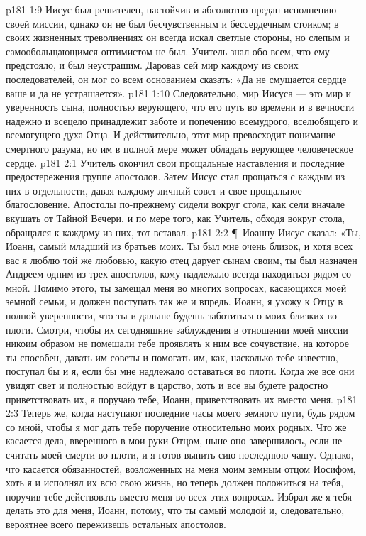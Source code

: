 \vs p181 1:9 Иисус был решителен, настойчив и абсолютно предан исполнению своей миссии, однако он не был бесчувственным и бессердечным стоиком; в своих жизненных треволнениях он всегда искал светлые стороны, но слепым и самообольщающимся оптимистом не был. Учитель знал обо всем, что ему предстояло, и был неустрашим. Даровав сей мир каждому из своих последователей, он мог со всем основанием сказать: «Да не смущается сердце ваше и да не устрашается».
\vs p181 1:10 Следовательно, мир Иисуса --- это мир и уверенность сына, полностью верующего, что его путь во времени и в вечности надежно и всецело принадлежит заботе и попечению всемудрого, вселюбящего и всемогущего духа Отца. И действительно, этот мир превосходит понимание смертного разума, но им в полной мере может обладать верующее человеческое сердце.
\vs p181 2:1 Учитель окончил свои прощальные наставления и последние предостережения группе апостолов. Затем Иисус стал прощаться с каждым из них в отдельности, давая каждому личный совет и свое прощальное благословение. Апостолы по\hyp{}прежнему сидели вокруг стола, как сели вначале вкушать от Тайной Вечери, и по мере того, как Учитель, обходя вокруг стола, обращался к каждому из них, тот вставал.
\vs p181 2:2 \P\ Иоанну Иисус сказал: «Ты, Иоанн, самый младший из братьев моих. Ты был мне очень близок, и хотя всех вас я люблю той же любовью, какую отец дарует сынам своим, ты был назначен Андреем одним из трех апостолов, кому надлежало всегда находиться рядом со мной. Помимо этого, ты замещал меня во многих вопросах, касающихся моей земной семьи, и должен поступать так же и впредь. Иоанн, я ухожу к Отцу в полной уверенности, что ты и дальше будешь заботиться о моих близких во плоти. Смотри, чтобы их сегодняшние заблуждения в отношении моей миссии никоим образом не помешали тебе проявлять к ним все сочувствие, на которое ты способен, давать им советы и помогать им, как, насколько тебе известно, поступал бы и я, если бы мне надлежало оставаться во плоти. Когда же все они увидят свет и полностью войдут в царство, хоть и все вы будете радостно приветствовать их, я поручаю тебе, Иоанн, приветствовать их вместо меня.
\vs p181 2:3 Теперь же, когда наступают последние часы моего земного пути, будь рядом со мной, чтобы я мог дать тебе поручение относительно моих родных. Что же касается дела, вверенного в мои руки Отцом, ныне оно завершилось, если не считать моей смерти во плоти, и я готов выпить сию последнюю чашу. Однако, что касается обязанностей, возложенных на меня моим земным отцом Иосифом, хоть я и исполнял их всю свою жизнь, но теперь должен положиться на тебя, поручив тебе действовать вместо меня во всех этих вопросах. Избрал же я тебя делать это для меня, Иоанн, потому, что ты самый молодой и, следовательно, вероятнее всего переживешь остальных апостолов.

